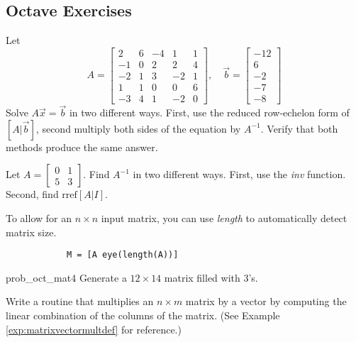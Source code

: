 \documentclass{ximera}
\begin{document}
\subsection*{Octave Exercises}
\begin{problem}\label{prob_oct_mat5}
    Let $$A=\begin{bmatrix}2 & 6 & -4 & 1 & 1\\
-1 & 0 & 2 & 2 & 4\\
-2 & 1 & 3 & -2 & 1\\
1 & 1 & 0 & 0 & 6\\
-3 & 4 & 1 & -2 & 0\end{bmatrix}, \quad \vec{b}=\begin{bmatrix}-12\\
 6\\
 -2\\
 -7\\
 -8\end{bmatrix}$$
Solve $A\vec{x}=\vec{b}$ in two different ways.  First, use the reduced row-echelon form of $[A|\vec{b}]$, second multiply both sides of the equation by $A^{-1}$.  Verify that both methods produce the same answer.
\end{problem}

\begin{problem}\label{prob_oct_mat1}
Let $A=\begin{bmatrix} 0 & 1\\5 & 3\end{bmatrix}$.  Find $A^{-1}$ in two different ways.  First, use the \emph{inv} function.  Second, find $\text{rref}[A|I]$.
    \begin{hint}
        To allow for an $n\times n$ input matrix, you can use \emph{length} to automatically detect matrix size.
        
        \begin{verbatim}
            M = [A eye(length(A))]  
        \end{verbatim}
    \end{hint}
\end{problem}   

\begin{problem}{prob_oct_mat4}
    Generate a $12\times 14$ matrix filled with $3$'s.
\end{problem}

\begin{problem}\label{prob_oct_mat2}
Write a routine that multiplies an $n\times m$ matrix by a vector by computing the linear combination of the columns of the matrix. (See Example \ref{exp:matrixvectormultdef} for reference.)  
\end{problem}
\end{document}
